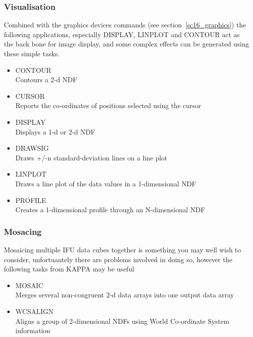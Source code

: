 \documentclass[twoside,11pt]{article}
\newcommand{\htmlref}[2]{#1}
\newcommand{\xref}[3]{#1}
\begin{document}
\subsubsection{Visualisation}

Combined with the \htmlref{graphics devices commands}\latexonly{ (see section~\ref{sc16_graphics})} the following applications, especially DISPLAY, LINPLOT and CONTOUR act as the back bone for image display, and some complex effects can be generated using these simple tasks.

\begin{itemize}  
\item{\xref{CONTOUR}{sun95}{CONTOUR}}\\
Contours a 2-d NDF 
\item{\xref{CURSOR}{sun95}{CURSOR}}\\
Reports the co-ordinates of positions selected using the cursor 
\item{\xref{DISPLAY}{sun95}{DISPLAY}}\\
Displays a 1-d or 2-d NDF 
\item{\xref{DRAWSIG}{sun95}{DRAWSIG}}\\
Draws +/-n standard-deviation lines on a line plot 
\item{\xref{LINPLOT}{sun95}{LINPLOT}}\\
Draws a line plot of the data values in a 1-dimensional NDF 
\item{\xref{PROFILE}{sun95}{PROFILE}}\\
Creates a 1-dimensional profile through an N-dimensional NDF 
\end{itemize}  

\subsubsection{Mosacing}

Mosaicing multiple IFU data cubes together is something you may well wish to consider, unfortuantely there are \htmlref{problems}{sc16_mos} involved in doing so, however the following tasks from KAPPA may be useful

\begin{itemize}  
\item{\xref{MOSAIC}{sun95}{MOSAIC}}\\
 Merges several non-congruent 2-d data arrays into one output data array \item{\xref{WCSALIGN}{sun95}{WCSALIGN}}\\
Aligns a group of 2-dimensional NDFs using World Co-ordinate System information 
\end{itemize}
\end{document}
